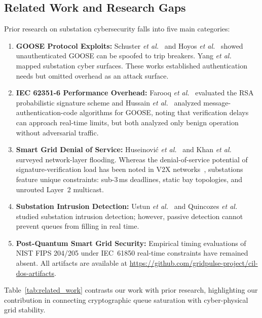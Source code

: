 \documentclass[journal]{IEEEtran}
\begin{document}
\subsection{Related Work and Research Gaps}
Prior research on substation cybersecurity falls into five main categories:
\begin{enumerate}[leftmargin=*,noitemsep,topsep=1pt]
    \item \textbf{GOOSE Protocol Exploits:} Schuster \textit{et al.}~\cite{schuster2017goose} and Hoyos \textit{et al.}~\cite{hoyos2012real} showed unauthenticated GOOSE can be spoofed to trip breakers. Yang \textit{et al.}~\cite{yang2013cyber} mapped substation cyber surfaces. These works established authentication needs but omitted overhead as an attack surface.
    \item \textbf{IEC 62351-6 Performance Overhead:} Farooq \textit{et al.}~\cite{farooq2019goose} evaluated the RSA probabilistic signature scheme and Hussain \textit{et al.}~\cite{kabir2020goose} analyzed message-authentication-code algorithms for GOOSE, noting that verification delays can approach real-time limits, but both analyzed only benign operation without adversarial traffic.
    \item \textbf{Smart Grid Denial of Service:} Huseinovi\'{c} \textit{et al.}~\cite{huseinovic2020dos} and Khan \textit{et al.}~\cite{khan2021survey} surveyed network-layer flooding. Whereas the denial-of-service potential of signature-verification load has been noted in V2X networks~\cite{biswas2014dos}, substations feature unique constraints: sub-3\,ms deadlines, static bay topologies, and unrouted Layer~2 multicast.
    \item \textbf{Substation Intrusion Detection:} Ustun \textit{et al.}~\cite{hussain2019goose} and Quincozes \textit{et al.}~\cite{quincozes2021survey} studied substation intrusion detection; however, passive detection cannot prevent queues from filling in real time.
    \item \textbf{Post-Quantum Smart Grid Security:} Empirical timing evaluations of NIST FIPS 204/205 under IEC~61850 real-time constraints have remained absent. All artifacts are available at \url{https://github.com/gridpulse-project/cil-dos-artifacts}.
\end{enumerate}

Table~\ref{tab:related_work} contrasts our work with prior research, highlighting our contribution in connecting cryptographic queue saturation with cyber-physical grid stability.
\end{document}
